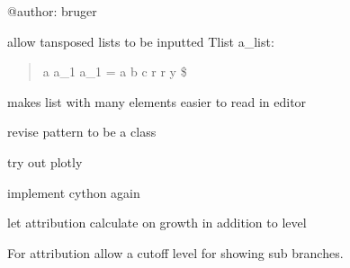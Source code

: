 \documentclass[letterpaper,10pt,english]{sphinxmanual}
\begin{document}
\sphinxAtStartPar
@author: bruger

\sphinxAtStartPar
allow tansposed lists to be inputted
Tlist a\_list:
\begin{quote}

\sphinxAtStartPar
a  a\_1 a\_1 =
a  b   c
r  r   y \$
\end{quote}

\sphinxAtStartPar
makes list with many elements easier to read in editor

\sphinxAtStartPar
revise pattern to be a class

\sphinxAtStartPar
try out plotly

\sphinxAtStartPar
implement cython again

\sphinxAtStartPar
let attribution calculate on growth in addition to level

\sphinxAtStartPar
For attribution allow a cutoff level for showing sub branches.
\end{document}
